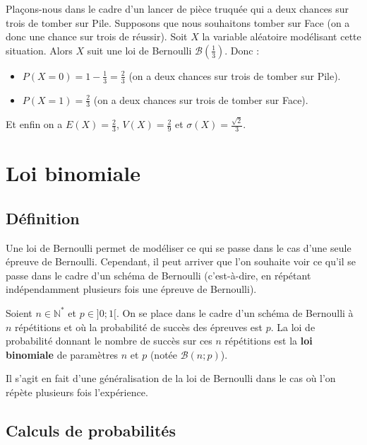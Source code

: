 	\begin{tip}[Exemple]
		Plaçons-nous dans le cadre d'un lancer de pièce truquée qui a deux chances sur trois de tomber sur Pile. Supposons que nous souhaitons tomber sur Face (on a donc une chance sur trois de réussir).
		\newpar
		Soit $X$ la variable aléatoire modélisant cette situation. Alors $X$ suit une loi de Bernoulli $\mathcal{B}\left(\frac{1}{3}\right)$. Donc :
		\begin{itemize}
			\item $P(X = 0) = 1 - \frac{1}{3} = \frac{2}{3}$ (on a deux chances sur trois de tomber sur Pile).
			\item $P(X = 1) = \frac{2}{3}$ (on a deux chances sur trois de tomber sur Face).
		\end{itemize}
		Et enfin on a $E(X) = \frac{2}{3}$, $V(X) = \frac{2}{9}$ et $\sigma(X) = \frac{\sqrt{2}}{3}$.
	\end{tip}

	\section{Loi binomiale}

	\subsection{Définition}

	Une loi de Bernoulli permet de modéliser ce qui se passe dans le cas d'une seule épreuve de Bernoulli. Cependant, il peut arriver que l'on souhaite voir ce qu'il se passe dans le cadre d'un schéma de Bernoulli (c'est-à-dire, en répétant indépendamment plusieurs fois une épreuve de Bernoulli).

	\begin{formula}[Définition]
		Soient $n \in \mathbb{N}^*$ et $p \in ]0; 1[$. On se place dans le cadre d'un schéma de Bernoulli à $n$ répétitions et où la probabilité de succès des épreuves est $p$.
		\newpar
		La loi de probabilité donnant le nombre de succès sur ces $n$ répétitions est la \textbf{loi binomiale} de paramètres $n$ et $p$ (notée $\mathcal{B}(n; p)$).
	\end{formula}

	\begin{tip}
		Il s'agit en fait d'une généralisation de la loi de Bernoulli dans le cas où l'on répète plusieurs fois l'expérience.
	\end{tip}

	\subsection{Calculs de probabilités}

